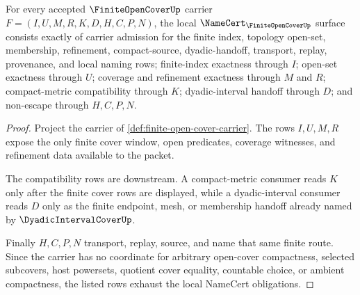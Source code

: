 \begin{theorem}
\label{thm:finite-open-cover-namecert-obligations}
For every accepted $\FiniteOpenCoverUp$ carrier $F=(I,U,M,R,K,D,H,C,P,N)$, the local $\NameCert_{\FiniteOpenCoverUp}$ surface consists exactly of carrier admission for the finite index, topology open-set, membership, refinement, compact-source, dyadic-handoff, transport, replay, provenance, and local naming rows; finite-index exactness through $I$; open-set exactness through $U$; coverage and refinement exactness through $M$ and $R$; compact-metric compatibility through $K$; dyadic-interval handoff through $D$; and non-escape through $H,C,P,N$.
\end{theorem}
\begin{proof}
Project the carrier of \autoref{def:finite-open-cover-carrier}. The rows $I,U,M,R$ expose the only finite cover window, open predicates, coverage witnesses, and refinement data available to the packet.

The compatibility rows are downstream. A compact-metric consumer reads $K$ only after the finite cover rows are displayed, while a dyadic-interval consumer reads $D$ only as the finite endpoint, mesh, or membership handoff already named by $\DyadicIntervalCoverUp$.

Finally $H,C,P,N$ transport, replay, source, and name that same finite route. Since the carrier has no coordinate for arbitrary open-cover compactness, selected subcovers, host powersets, quotient cover equality, countable choice, or ambient compactness, the listed rows exhaust the local NameCert obligations.
\end{proof}

